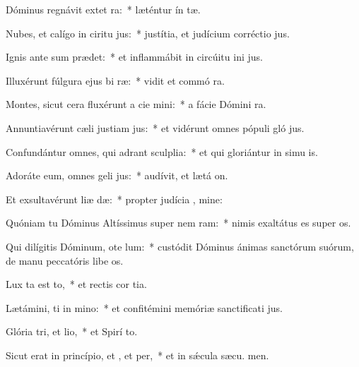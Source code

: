 \item Dóminus regnávit extet ra:~* læténtur ín tæ.
\item Nubes, et calígo in ciritu jus:~* justítia, et judícium corréctio  jus.
\item Ignis ante sum prædet:~* et inflammábit in circúitu ini jus.
\item Illuxérunt fúlgura ejus bi ræ:~* vidit et commó  ra.
\item Montes, sicut cera fluxérunt a cie mini:~* a fácie Dómini  ra.
\item Annuntiavérunt cæli justiam jus:~* et vidérunt omnes pópuli gló jus.
\item Confundántur omnes, qui adrant sculplia:~* et qui gloriántur in simu is.
\item Adoráte eum, omnes geli jus:~* audívit, et lætá  on.
\item Et exsultavérunt liæ dæ:~* propter judícia , mine:
\item Quóniam tu Dóminus Altíssimus super nem ram:~* nimis exaltátus es super  os.
\item Qui dilígitis Dóminum, ote lum:~* custódit Dóminus ánimas sanctórum suórum, de manu peccatóris libe os.
\item Lux ta est to,~* et rectis cor tia.
\item Lætámini, ti in mino:~* et confitémini memóriæ sanctificati jus.
\item Glória tri, et lio,~* et Spirí to.
\item Sicut erat in princípio, et , et per,~* et in sǽcula sæcu. men.
